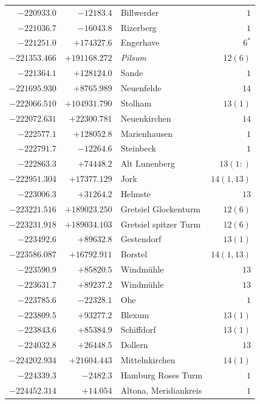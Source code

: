\begin{center}
\begin{tabular}{r|r|p{170pt}|r}
\(-220933.0\)&\(-12183.4\)&Billwerder&\(1\)\\
\(-221036.7\)&\(-16043.8\)&Rizerberg&\(1\)\\
\(-221251.0\)&\(+174327.6\)&Engerhave&\(6^{*}\)\\
\(-221353.466\)&\(+191168.272\)&\textit{Pilsum}&\(12 (6)\)\\
\(-221364.1\)&\(+128124.0\)&Sande&\(1\)\\
\(-221695.930\)&\(+8765.989\)&Neuenfelde&\(14\)\\
\(-222066.510\)&\(+104931.790\)&Stolham&\(13 (1)\)\\
\(-222072.631\)&\(+22300.781\)&Neuenkirchen&\(14\)\\
\(-222577.1\)&\(+128052.8\)&Marienhausen&\(1\)\\
\(-222791.7\)&\(-12264.6\)&Steinbeck&\(1\)\\
\(-222863.3\)&\(+74448.2\)&Alt Lunenberg&\(13 (1:)\)\\
\(-222951.304\)&\(+17377.129\)&Jork&\(14(1,13)\)\\
\(-223006.3\)&\(+31264.2\)&Helmste&\(13\)\\
\(-223221.516\)&\(+189023.250\)&Gretsiel Glockenturm&\(12 (6)\)\\
\(-223231.918\)&\(+189034.103\)&Gretsiel spitzer Turm&\(12 (6)\)\\
\(-223492.6\)&\(+89632.8\)&Gestendorf&\(13 (1)\)\\
\(-223586.087\)&\(+16792.911\)&Borstel&\(14(1,13)\)\\
\(-223590.9\)&\(+85820.5\)&Windmühle&\(13\)\\
\(-223631.7\)&\(+89237.2\)&Windmühle&\(13\)\\
\(-223785.6\)&\(-22328.1\)&Ohe&\(1\)\\
\(-223809.5\)&\(+93277.2\)&Blexum&\(13 (1)\)\\
\(-223843.6\)&\(+85384.9\)&Schiffdorf&\(13 (1)\)\\
\(-224032.8\)&\(+26448.5\)&Dollern&\(13\)\\
\(-224202.934\)&\(+21604.443\)&Mittelnkirchen&\(14 (1)\)\\
\(-224339.3\)&\(-2482.3\)&Hamburg Roses Turm&\(1\)\\
\(-224452.314\)&\(+14.054\)&Altona, Meridiankreis&\(1\)\\
\hline\end{tabular}\endgroup\end{center}
